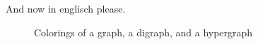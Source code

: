 
And now in englisch please.

\bigskip

\begin{figure}[htp!]
\centering
\resizebox{.7\linewidth}{!}{

}
\caption*{Colorings of a graph, a digraph, and a hypergraph}
\end{figure}